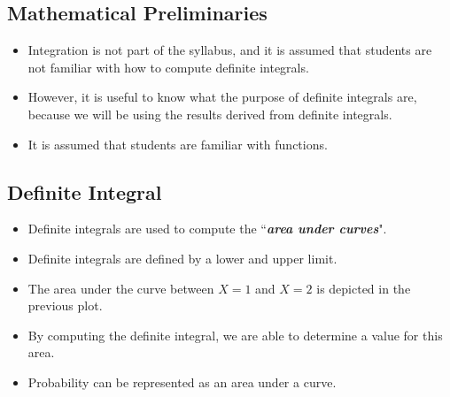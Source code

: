 


\subsection*{Mathematical Preliminaries}
\begin{itemize}
\item Integration is not part of the syllabus, and it is assumed that students are not familiar with how to compute definite integrals.
\item However,  it is useful to know what the purpose of definite integrals are, because we will be using the results derived from definite integrals. \item It is assumed that students are familiar with functions.
\end{itemize}



\subsection*{Definite Integral}
\begin{itemize}
\item Definite integrals are used to compute the ``\textbf{\textit{area under curves}}".
\item Definite integrals are defined by a lower and upper limit.
\item The area under the curve between $X=1$ and $X=2$ is depicted in the previous plot.
\item By computing the definite integral, we are able to determine a value for this area.
\item Probability can be represented as an area under a curve.
\end{itemize}

